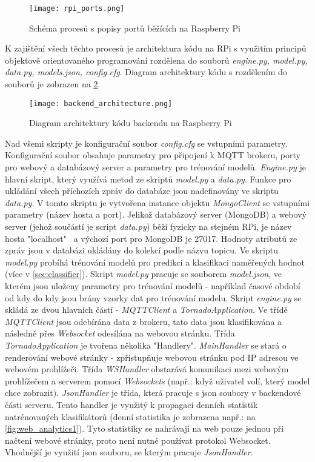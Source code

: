\begin{figure}[H]
  \centering
  \texttt{[image: rpi\_ports.png]}
  \caption{Schéma procesů s popisy portů běžících na Raspberry Pi}
  \label{fig:rpi_ports}
\end{figure}

K zajištění všech těchto procesů je architektura kódu na RPi s využitím principů objektově orientovaného programování rozdělena do souborů \textit{engine.py, model.py, data.py, models.json, config.cfg}. Diagram architektury kódu s rozdělením do souborů je zobrazen na \cref{fig:backend_architecture}.

\begin{figure}[H]
  \centering
  \texttt{[image: backend\_architecture.png]}
  \caption{Diagram architektury kódu backendu na Raspberry Pi}
  \label{fig:backend_architecture}
\end{figure}

Nad všemi skripty je konfigurační soubor \textit{config.cfg} se vstupními parametry. Konfigurační soubor obsahuje parametry pro připojení k MQTT brokeru, porty pro webový a databázový server a parametry pro trénování modelů. \textit{Engine.py} je hlavní skript, který využívá metod ze skriptů \textit{model.py} a \textit{data.py}. Funkce pro ukládání všech příchozích zpráv do databáze jsou nadefinovány ve skriptu \textit{data.py}. V tomto skriptu je vytvořena instance objektu \textit{MongoClient} se vstupními parametry (název hosta a port). Jelikož databázový server (MongoDB) a webový server (jehož součástí je script \textit{data.py}) běží fyzicky na stejném RPi, je název hosta "localhost" \ a výchozí port pro MongoDB je 27017. Hodnoty atributů ze zpráv jsou v databázi ukládány do kolekcí podle názvu topicu. Ve skriptu \textit{model.py} probíhá trénování modelů pro predikci a klasifikaci naměřených hodnot (více v \cref{sec:classifier}). Skript \textit{model.py} pracuje se souborem \textit{model.json}, ve kterém jsou uloženy parametry pro trénování modelů - například časové období od kdy do kdy jsou brány vzorky dat pro trénování modelu. Skript \textit{engine.py} se skládá ze dvou hlavních částí - \textit{MQTTClient} a \textit{TornadoApplication}. Ve třídě \textit{MQTTClient} jsou odebírána data z brokeru, tato data jsou klasifikována a následně přes \textit{Websocket} odesílána na webovou stránku. Třída \textit{TornadoApplication} je tvořena několika "Handlery". \textit{MainHandler} se stará o renderování webové stránky - zpřístupňuje webovou stránku pod IP adresou ve webovém prohlížeči. Třída \textit{WSHandler} obstarává komunikaci mezi webovým prohlížečem a serverem pomocí \textit{Websockets} (např.: když uživatel volí, který model chce zobrazit). \textit{JsonHandler} je třída, která pracuje s json soubory v backendové části serveru. Tento handler je využitý k propagaci denních statistik natrénovaných klasifikátorů (denní statistika je zobrazena např.: na \cref{fig:web_analytics1}). Tyto statistiky se nahrávají na web pouze jednou při načtení webové stránky, proto není nutné používat protokol Websocket. Vhodnější je využití json souboru, se kterým pracuje \textit{JsonHandler}.

